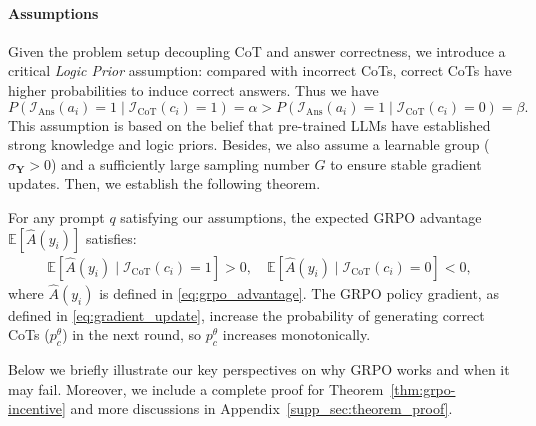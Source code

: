 \paragraph{Assumptions}
Given the problem setup decoupling CoT and answer correctness, we introduce a critical \emph{Logic Prior} assumption: compared with incorrect CoTs, correct CoTs have higher probabilities to induce correct answers. Thus we have
\begin{equation}
P(\mathcal{I}_{\text{Ans}}(a_i)=1 \mid \mathcal{I}_{\text{CoT}}(c_i)=1) = \alpha > 
P(\mathcal{I}_{\text{Ans}}(a_i)=1 \mid \mathcal{I}_{\text{CoT}}(c_i)=0) = \beta .
\label{eq:assumption_alpha}
\end{equation}
This assumption is based on the belief that pre-trained LLMs have established strong knowledge and logic priors.
Besides, we also assume a learnable group ($\sigma_{\mathbf{Y}} > 0$) and a sufficiently large sampling number $G$ to ensure stable gradient updates.
Then, we establish the following theorem.

\begin{theorem}
\label{thm:grpo-incentive}
For any prompt $q$ satisfying our assumptions, the expected GRPO advantage $\mathbb{E}[\hat{A}(y_i)]$ satisfies:
\begin{align}
\mathbb{E}\left[\hat{A}(y_i) \mid \mathcal{I}_{\text{CoT}}(c_i)=1\right] > 0,
\quad
\mathbb{E}\left[\hat{A}(y_i) \mid \mathcal{I}_{\text{CoT}}(c_i)=0\right] < 0,
\label{eq:theorem_advantage_guarantee}
\end{align}
where $\hat{A}(y_i)$ is defined in \eqref{eq:grpo_advantage}.
The GRPO policy gradient, as defined in \eqref{eq:gradient_update}, increase the probability of generating correct CoTs ($p^\theta_c$) in the next round, so $p^\theta_c$ increases monotonically.
\end{theorem}

Below we briefly illustrate our key perspectives on why GRPO works and when it may fail. Moreover, we include a complete proof for Theorem~\ref{thm:grpo-incentive} and more discussions in Appendix~\ref{supp_sec:theorem_proof}.

